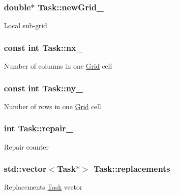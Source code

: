 \subsubsection[{\texorpdfstring{new\+Grid\+\_\+}{newGrid_}}]{\setlength{\rightskip}{0pt plus 5cm}double$\ast$ Task\+::new\+Grid\+\_\+\hspace{0.3cm}{\ttfamily [private]}}\hypertarget{classTask_a554be6d55c1e3204cf946d9c0faf97c3}{}\label{classTask_a554be6d55c1e3204cf946d9c0faf97c3}
Local sub-\/grid 
\subsubsection[{\texorpdfstring{nx\+\_\+}{nx_}}]{\setlength{\rightskip}{0pt plus 5cm}const int Task\+::nx\+\_\+\hspace{0.3cm}{\ttfamily [private]}}\hypertarget{classTask_ad42667f57720ad0304e329e9d5b2b1f2}{}\label{classTask_ad42667f57720ad0304e329e9d5b2b1f2}
Number of columns in one \hyperlink{classGrid}{Grid} cell 
\subsubsection[{\texorpdfstring{ny\+\_\+}{ny_}}]{\setlength{\rightskip}{0pt plus 5cm}const int Task\+::ny\+\_\+\hspace{0.3cm}{\ttfamily [private]}}\hypertarget{classTask_a786ae2a58cd74dda7142dc19649d87c5}{}\label{classTask_a786ae2a58cd74dda7142dc19649d87c5}
Number of rows in one \hyperlink{classGrid}{Grid} cell 
\subsubsection[{\texorpdfstring{repair\+\_\+}{repair_}}]{\setlength{\rightskip}{0pt plus 5cm}int Task\+::repair\+\_\+\hspace{0.3cm}{\ttfamily [private]}}\hypertarget{classTask_a7c5c4a8e56053d8358ba46a756deab3e}{}\label{classTask_a7c5c4a8e56053d8358ba46a756deab3e}
Repair counter 
\subsubsection[{\texorpdfstring{replacements\+\_\+}{replacements_}}]{\setlength{\rightskip}{0pt plus 5cm}std\+::vector$<${\bf Task}$\ast$$>$ Task\+::replacements\+\_\+\hspace{0.3cm}{\ttfamily [private]}}\hypertarget{classTask_a308c2c8b24a94d163fc95b3e0951132b}{}\label{classTask_a308c2c8b24a94d163fc95b3e0951132b}
Replacements \hyperlink{classTask}{Task} vector 
